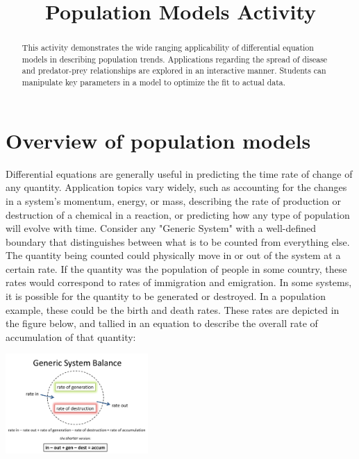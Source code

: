 \documentclass{ximera}
\title{Population Models Activity}
\begin{document}
   
\begin{abstract}
This activity demonstrates the wide ranging applicability of differential equation models in describing population trends.  Applications regarding the spread of disease and predator-prey relationships are explored in an interactive manner.  Students can manipulate key parameters in a model to optimize the fit to actual data.    
\end{abstract}
   
\maketitle
   
\section*{Overview of population models}
Differential equations are generally useful in predicting the time rate of change of any quantity.  Application topics vary widely, such as accounting for the changes in a system’s momentum, energy, or mass, describing the rate of production or destruction of a chemical in a reaction, or predicting how any type of population will evolve with time.  Consider any "Generic System" with a well-defined boundary that distinguishes between what is to be counted from everything else.  The quantity being counted could physically move in or out of the system at a certain rate.  If the quantity was the population of people in some country, these rates would correspond to rates of immigration and emigration.  In some systems, it is possible for the quantity to be generated or destroyed.  In a population example, these could be the birth and death rates.  These rates are depicted in the figure below, and tallied in an equation to describe the overall rate of accumulation of that quantity: 
 
 \begin{image}
 \includegraphics[height=1.5in]{populationModelPic.jpg} 
\end{image}
\end{document}
